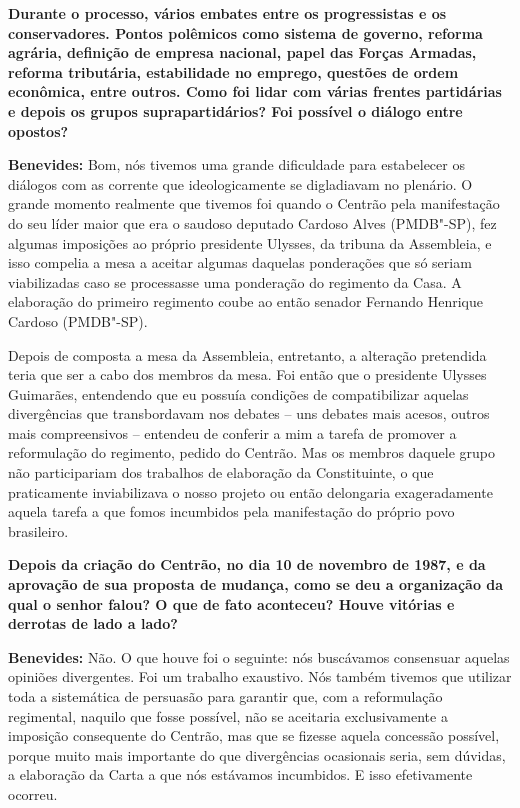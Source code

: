 \textbf{Durante o processo, vários embates entre os progressistas e os
conservadores. Pontos polêmicos como sistema de governo, reforma
agrária, definição de empresa nacional, papel das Forças Armadas,
reforma tributária, estabilidade no emprego, questões de ordem
econômica, entre outros. Como foi lidar com várias frentes partidárias e
depois os grupos suprapartidários? Foi possível o diálogo entre
opostos?}

\textbf{Benevides:} Bom, nós tivemos uma grande dificuldade para
estabelecer os diálogos com as corrente que ideologicamente se
digladiavam no plenário. O grande momento realmente que tivemos foi
quando o Centrão pela manifestação do seu líder maior que era o saudoso
deputado Cardoso Alves (PMDB"-SP), fez algumas imposições ao próprio
presidente Ulysses, da tribuna da Assembleia, e isso compelia a mesa a
aceitar algumas daquelas ponderações que só seriam viabilizadas caso se
processasse uma ponderação do regimento da Casa. A elaboração do
primeiro regimento coube ao então senador Fernando Henrique Cardoso
(PMDB"-SP).

Depois de composta a mesa da Assembleia, entretanto, a alteração
pretendida teria que ser a cabo dos membros da mesa. Foi então que o
presidente Ulysses Guimarães, entendendo que eu possuía condições de
compatibilizar aquelas divergências que transbordavam nos debates -- uns
debates mais acesos, outros mais compreensivos -- entendeu de conferir a
mim a tarefa de promover a reformulação do regimento, pedido do Centrão.
Mas os membros daquele grupo não participariam dos trabalhos de
elaboração da Constituinte, o que praticamente inviabilizava o nosso
projeto ou então delongaria exageradamente aquela tarefa a que fomos
incumbidos pela manifestação do próprio povo brasileiro.

\textbf{Depois da criação do Centrão, no dia 10 de novembro de 1987, e
da aprovação de sua proposta de mudança, como se deu a organização da
qual o senhor falou? O que de fato aconteceu? Houve vitórias e derrotas
de lado a lado?}

\textbf{Benevides:} Não. O que houve foi o seguinte: nós buscávamos
consensuar aquelas opiniões divergentes. Foi um trabalho exaustivo. Nós
também tivemos que utilizar toda a sistemática de persuasão para
garantir que, com a reformulação regimental, naquilo que fosse possível,
não se aceitaria exclusivamente a imposição consequente do Centrão, mas
que se fizesse aquela concessão possível, porque muito mais importante
do que divergências ocasionais seria, sem dúvidas, a elaboração da Carta
a que nós estávamos incumbidos. E isso efetivamente ocorreu.

